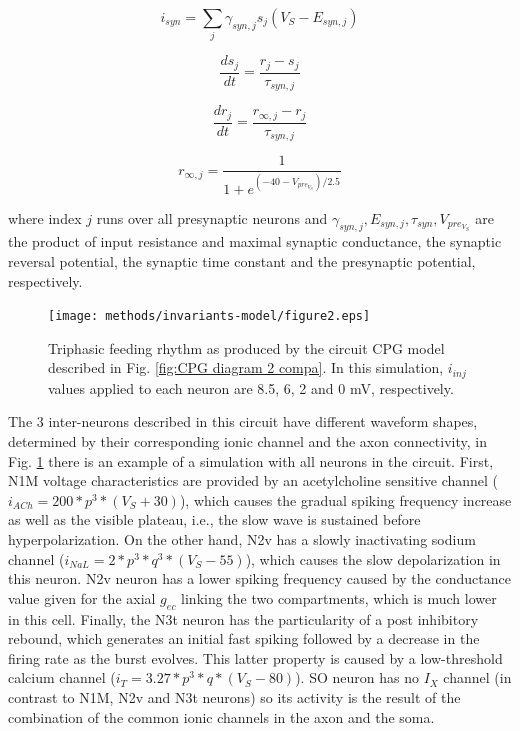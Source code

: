 \begin{equation}
	i_{syn} = \sum_j \gamma_{syn,j} s_j (V_S - E_{syn,j})
	\label{eq:syn1}
\end{equation}

\begin{equation}
	\frac{ds_j}{dt} = \frac{r_{j}-s_j}{\tau_{syn,j}}
\end{equation}

\begin{equation}
	\frac{dr_j}{dt} = \frac{r_{\infty,j}-r_j}{\tau_{syn,j}}
\end{equation}

\begin{equation}
	r_{\infty,j}=\frac{1}{1+e^{(-40-V_{pre_{V_S}})/2.5}}
	\label{eq:syn2}
\end{equation}


\noindent where index $j$ runs over all presynaptic neurons and \(\gamma_{syn,j}, E_{syn,j},\tau_{syn},V_{pre_{V_S}}\) are the product of input resistance and maximal synaptic conductance, the synaptic reversal potential, the synaptic time constant and the presynaptic potential, respectively. 


\begin{figure}[h!]
	\centering
	\texttt{[image: methods/invariants-model/figure2.eps]}
	\caption{Triphasic feeding rhythm as produced by the circuit CPG model described in Fig. \ref{fig:CPG diagram 2 compa}. In this simulation, $i_{inj}$ values applied to each neuron are 8.5, 6, 2 and 0 mV, respectively.}
	\label{fig:model simulation}
\end{figure}

The 3 inter-neurons described in this circuit have different waveform shapes, determined by their corresponding ionic channel and the axon connectivity, in Fig. \ref{fig:model simulation}   there is an example of a simulation with all neurons in the circuit. First, N1M voltage characteristics are provided by an acetylcholine sensitive channel (\(i_{ACh} = 200 * p^3 * (V_S + 30)\)), which causes the gradual spiking frequency increase as well as the visible plateau, i.e., the slow wave is sustained before hyperpolarization. On the other hand, N2v has a slowly inactivating sodium channel (\(i_{NaL} = 2 * p^3 * q^3 * (V_S-55)\)), which causes the slow depolarization in this neuron. N2v neuron has a lower spiking frequency caused by the conductance value given for the axial $g_{ec}$ linking the two compartments, which is much lower in this cell. Finally, the N3t neuron has the particularity of a post inhibitory rebound, which generates an initial fast spiking followed by a decrease in the firing rate as the burst evolves. This latter property is caused by a low-threshold calcium channel (\( i_T = 3.27 * p^3 * q *(V_S-80)\)). SO neuron has no \(I_X\) channel (in contrast to N1M, N2v and N3t neurons) so its activity is the result of the combination of the common ionic channels in the axon and the soma.

